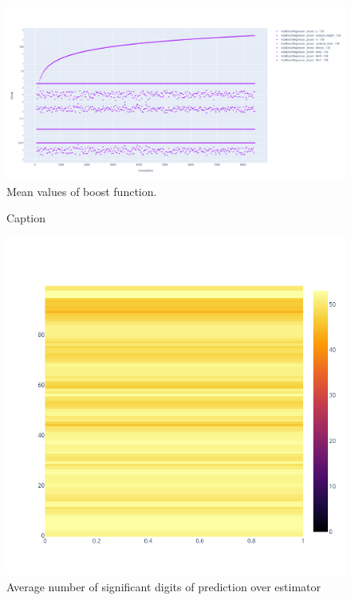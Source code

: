 \documentclass[11pt]{article}
\begin{document}
\begin{figure}
    \centering
    \includegraphics[width=\linewidth]{figure/adaboost/adaboost_boost_mean.png}
    \caption{Mean values of boost function.}
    \label{fig:adaboost_boost_mean}
\end{figure}

\begin{figure}
    \centering
    \caption{Caption}
    \includegraphics[width=\linewidth]{figure/adaboost/predict_adaboost_zoom_s.png}
    \caption{Average number of significant digits of prediction over estimator}
    \label{fig:adaboost_predict_zoom_s}
\end{figure}
\end{document}
